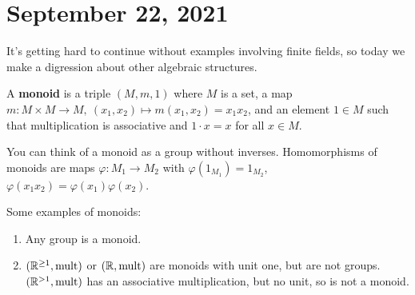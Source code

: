 \section{September 22, 2021} 
It's getting hard to continue without examples involving finite fields, so today we make a digression about other algebraic structures.

\begin{definition}[]
    A \textbf{monoid} is a triple $(M,m,1)$ where $M$ is a set, a map $m \colon M\times M \to M, \ (x_1,x_2) \mapsto  m(x_1,x_2)=x_1x_2$, and an element $1 \in M$ such that multiplication is associative and $1\cdot x=x$ for all $x \in M$.
\end{definition}
You can think of a monoid as a group without inverses. Homomorphisms of monoids are maps $\varphi  \colon M_1 \to M_2$ with $\varphi (1_{M_1})=1_{M_2}$, $\varphi (x_1x_2)=\varphi (x_1)\varphi (x_2)$.
\begin{example}Some examples of monoids:
\begin{enumerate}[label=(\arabic*)]
\setlength\itemsep{-.2em}
    \item Any group is a monoid.
    \item $(\mathbb{R} ^{\geq 1}, \text{mult} )$ or $(\mathbb{R}, \text{mult} )$ are monoids with unit one, but are not groups. $(\mathbb{R}^{>1}, \text{mult} )$ has an associative multiplication, but no unit, so is not a monoid.
\end{enumerate}
\end{example}

